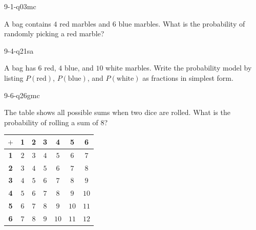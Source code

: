 \begin{practiceQuestion}{9-1-q03}{mc}
\begin{questionText}
A bag contains $4$ red marbles and $6$ blue marbles. What is the probability of randomly picking a red marble?
\end{questionText}
\end{practiceQuestion}

\begin{practiceQuestion}{9-4-q21}{sa}
\begin{questionText}
A bag has $6$ red, $4$ blue, and $10$ white marbles. Write the probability model by listing $P(\text{red})$, $P(\text{blue})$, and $P(\text{white})$ as fractions in simplest form.
\end{questionText}
\end{practiceQuestion}

\begin{practiceQuestion}{9-6-q26}{gmc}
\begin{questionText}
The table shows all possible sums when two dice are rolled. What is the probability of rolling a sum of $8$?

\begin{center}
\begin{tabular}{|c|c|c|c|c|c|c|}
\hline
$+$ & \textbf{1} & \textbf{2} & \textbf{3} & \textbf{4} & \textbf{5} & \textbf{6} \\
\hline
\textbf{1} & $2$ & $3$ & $4$ & $5$ & $6$ & $7$ \\
\hline
\textbf{2} & $3$ & $4$ & $5$ & $6$ & $7$ & \cellcolor{funBlue!20}$8$ \\
\hline
\textbf{3} & $4$ & $5$ & $6$ & $7$ & \cellcolor{funBlue!20}$8$ & $9$ \\
\hline
\textbf{4} & $5$ & $6$ & $7$ & \cellcolor{funBlue!20}$8$ & $9$ & $10$ \\
\hline
\textbf{5} & $6$ & $7$ & \cellcolor{funBlue!20}$8$ & $9$ & $10$ & $11$ \\
\hline
\textbf{6} & $7$ & \cellcolor{funBlue!20}$8$ & $9$ & $10$ & $11$ & $12$ \\
\hline
\end{tabular}
\end{center}
\end{questionText}
\end{practiceQuestion}

